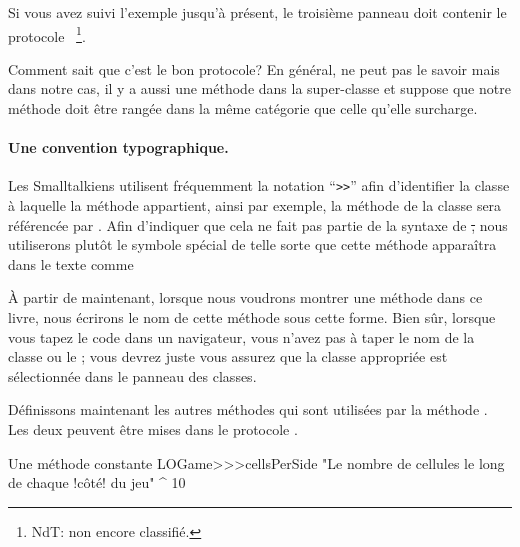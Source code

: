 \documentclass[a4paper,10pt,twoside]{book}
\begin{document}
Si vous avez suivi l'exemple jusqu'à présent, le troisième panneau doit contenir le protocole ~\footnote{NdT: non encore classifié.}.

Comment \pharo sait que c'est le bon protocole? En général,
\pharo ne peut pas le savoir mais dans notre cas, il y a aussi une méthode  dans la super-classe et \pharo suppose que notre méthode  doit être rangée dans la même catégorie que celle qu'elle surcharge.


\paragraph{Une convention typographique.} Les Smalltalkiens utilisent fréquemment la notation ``\verb|>>|'' afin d'identifier la classe à laquelle la méthode appartient, ainsi par exemple, la méthode  de la classe  sera référencée par .
Afin d'indiquer que cela ne fait pas partie de la syntaxe de \st, nous utiliserons plutôt le symbole spécial \ct{>>>} de telle sorte que cette méthode apparaîtra dans le texte comme 

À partir de maintenant, lorsque nous voudrons montrer une méthode dans ce livre, nous écrirons le nom de cette méthode sous cette forme. Bien sûr, lorsque vous tapez le code dans un navigateur, vous n'avez pas à taper le nom de la classe ou le \ct{>>>}; vous devrez juste vous assurez que la classe appropriée est sélectionnée dans le panneau des classes.

Définissons maintenant les autres méthodes qui sont utilisées par la méthode . Les deux peuvent être mises dans le protocole .

\begin{method}[sbegamecellsperside]{Une méthode constante}
LOGame>>>cellsPerSide
   "Le nombre de cellules le long de chaque !côté! du jeu"
   ^ 10
\end{method}
\end{document}
